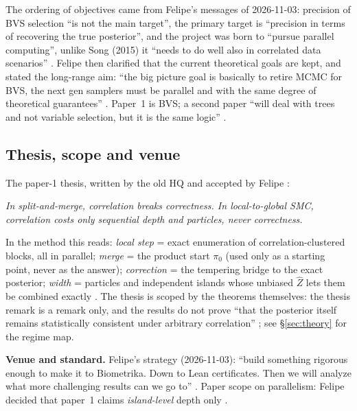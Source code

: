 The ordering of objectives came from Felipe's messages of 2026-11-03: precision of BVS selection ``is not the main target'', the primary target is ``precision in terms of recovering the true posterior'', and the project was born to ``pursue parallel computing'', unlike Song (2015) it ``needs to do well also in correlated data scenarios''  . Felipe then clarified that the current theoretical goals are kept, and stated the long-range aim: ``the big picture goal is basically to retire MCMC for BVS, the next gen samplers must be parallel and with the same degree of theoretical guarantees''  . Paper~1 is BVS; a second paper ``will deal with trees and not variable selection, but it is the same logic'' .

\subsection{Thesis, scope and venue}\label{sec:problem:thesis}

The paper-1 thesis, written by the old HQ and accepted by Felipe  :
\begin{center}
\emph{In split-and-merge, correlation breaks correctness. In local-to-global SMC, correlation costs only sequential depth and particles, never correctness.}
\end{center}
In the method this reads: \emph{local step} = exact enumeration of correlation-clustered blocks, all in parallel; \emph{merge} = the product start $\pi_0$ (used only as a starting point, never as the answer); \emph{correction} = the tempering bridge to the exact posterior; \emph{width} = particles and independent islands whose unbiased $\hat Z$ lets them be combined exactly . The thesis is scoped by the theorems themselves: the thesis remark  is a remark only, and the results do not prove ``that the posterior itself remains statistically consistent under arbitrary correlation'' ; see \S\ref{sec:theory} for the regime map.

\textbf{Venue and standard.} Felipe's strategy (2026-11-03): ``build something rigorous enough to make it to Biometrika. Down to Lean certificates. Then we will analyze what more challenging results can we go to''  . Paper scope on parallelism: Felipe decided that paper~1 claims \emph{island-level} depth only .

